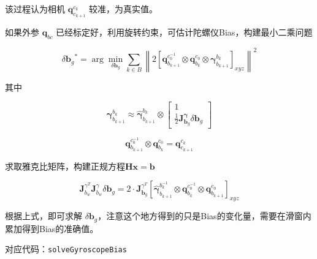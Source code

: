 \documentclass[12pt,a4paper]{article}
\begin{document}
该过程认为相机 $\mathbf{q}^{c_k}_{c_{k+1}}$ 较准，为真实值。

如果外参 $\mathbf{q}_{bc}$ 已经标定好，利用旋转约束，可估计陀螺仪Bias，构建最小二乘问题

\begin{equation}
{\delta \mathbf{b}_g}^{*} =
\arg \min_{\delta \mathbf{b}_g} \sum_{k\in B}
\left \| 
2 \left[
\mathbf{q}^{c_{0}^{-1}}_{b_{k+1}} \otimes \mathbf{q}^{c_{0}}_{b_{k}}
\otimes \boldsymbol{\gamma}_{b_{k+1}}^{b_{k}}
\right]_{xyz} 
\right \|^{2}
\end{equation}

其中

\begin{equation}
\boldsymbol{\gamma}_{b_{k+1}}^{b_{k}}
\approx 
\hat{\boldsymbol{\gamma}}_{b_{k+1}}^{b_{k}} \otimes 
\begin{bmatrix}
1 \\ \frac{1}{2} \mathbf{J}^{\boldsymbol{\gamma}}_{\mathbf{b}_{g}} \delta \mathbf{b}_{g}
\end{bmatrix}
\end{equation}

\begin{equation}
\mathbf{q}^{c_{0}^{-1}}_{b_{k+1}} \otimes \mathbf{q}^{c_{0}}_{b_{k}} = \mathbf{q}^{c_k}_{c_{k+1}}
\end{equation}

求取雅克比矩阵，构建正规方程$\mathbf{Hx} = \mathbf{b}$

\begin{equation}
\mathbf{J}^{\gamma^{T}}_{b_{w}} \mathbf{J}^{\gamma }_{b_{w}} \delta \mathbf{b}_{g}
=
2 \cdot \mathbf{J}^{\gamma^{T}}_{\mathbf{b}_g}
\left[
\hat{\boldsymbol{\gamma}}_{b_{k+1}}^{b_{k}^{-1}} \otimes \mathbf{q}^{c_{0}^{-1}}_{b_{k}} \otimes \mathbf{q}^{c_{0}}_{b_{k+1}}
\right]_{xyz}
\end{equation}

根据上式，即可求解 $\delta \mathbf{b}_g$，注意这个地方得到的只是Bias的变化量，需要在滑窗内累加得到Bias的准确值。   

对应代码：\verb|solveGyroscopeBias|
\end{document}

